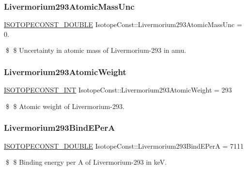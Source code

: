 \subsubsection{\texorpdfstring{Livermorium293\+Atomic\+Mass\+Unc}{Livermorium293AtomicMassUnc}}
{\footnotesize\ttfamily \mbox{\hyperlink{group___isotope_const-_macros_ga8f45a7272ce02c0b4c65c44636ed719a}{I\+S\+O\+T\+O\+P\+E\+C\+O\+N\+S\+T\+\_\+\+D\+O\+U\+B\+LE}} Isotope\+Const\+::\+Livermorium293\+Atomic\+Mass\+Unc = 0.}

\$ \$ Uncertainty in atomic mass of Livermorium-\/293 in amu. \mbox{\label{group___isotope_const-_livermorium-_lv293_gab5b11adc84b57a9807a1242c1b228c96}} 
\subsubsection{\texorpdfstring{Livermorium293\+Atomic\+Weight}{Livermorium293AtomicWeight}}
{\footnotesize\ttfamily \mbox{\hyperlink{group___isotope_const-_macros_ga5f18360b3e99483a35c32d789e62621c}{I\+S\+O\+T\+O\+P\+E\+C\+O\+N\+S\+T\+\_\+\+I\+NT}} Isotope\+Const\+::\+Livermorium293\+Atomic\+Weight = 293}

\$ \$ Atomic weight of Livermorium-\/293. \mbox{\label{group___isotope_const-_livermorium-_lv293_ga86e5dc679a1d71e982ea8c679e9bd3ca}} 
\subsubsection{\texorpdfstring{Livermorium293\+Bind\+E\+PerA}{Livermorium293BindEPerA}}
{\footnotesize\ttfamily \mbox{\hyperlink{group___isotope_const-_macros_ga8f45a7272ce02c0b4c65c44636ed719a}{I\+S\+O\+T\+O\+P\+E\+C\+O\+N\+S\+T\+\_\+\+D\+O\+U\+B\+LE}} Isotope\+Const\+::\+Livermorium293\+Bind\+E\+PerA = 7111}

\$ \$ Binding energy per A of Livermorium-\/293 in keV. \mbox{\label{group___isotope_const-_livermorium-_lv293_gaad3f7c6239e608f7819ef8b06e84eea2}} 
